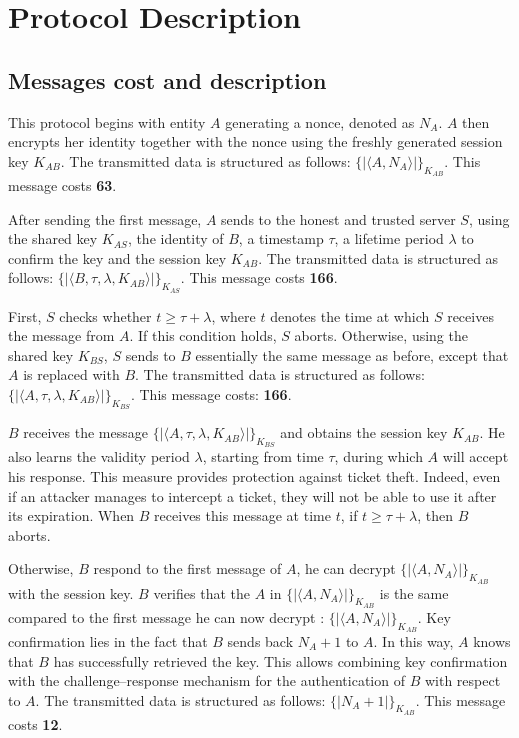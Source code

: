 \section{Protocol Description}

\subsection{Messages cost and description}



This protocol begins with entity $A$ generating a nonce, denoted as $N_A$. $A$ then encrypts her identity together
with the nonce using the freshly generated session key $K_{AB}$. The transmitted data is structured as follows:
$\{| \langle A,N_A \rangle |\}_{K_{AB}}$. This message costs \textbf{63}.

\vspace{1cm}

After sending the first message, $A$ sends to the honest and trusted server $S$, using the shared key $K_{AS}$,
the identity of $B$, a timestamp $\tau$, a lifetime period $\lambda$ to confirm the key and the session key $K_{AB}$.
The transmitted data is structured as follows: $\{| \langle B, \tau, \lambda, K_{AB} \rangle |\}_{K_{AS}}$. This message costs \textbf{166}.

\vspace{1cm}

First, $S$ checks whether $t \geq \tau + \lambda$, where $t$ denotes the time at which $S$ receives the message from
$A$. If this condition holds, $S$ aborts. Otherwise, using the shared key $K_{BS}$, $S$ sends to $B$ essentially the
same message as before, except that $A$ is replaced with $B$. The transmitted data is structured as follows:
$\{| \langle A, \tau, \lambda, K_{AB} \rangle |\}_{K_{BS}}$. This message costs: \textbf{166}.

\vspace{1cm}

$B$ receives the message $\{| \langle A, \tau, \lambda, K_{AB} \rangle |\}_{K_{BS}}$ and obtains the session key $K_{AB}$.
He also learns the validity period $\lambda$, starting from time $\tau$, during which $A$ will accept his response.
This measure provides protection against ticket theft. Indeed, even if an attacker manages to intercept a ticket,
they will not be able to use it after its expiration. When $B$ receives this message at time $t$, if
$t \geq \tau + \lambda$, then $B$ aborts.

Otherwise, $B$ respond to the first message of $A$, he can decrypt $\{| \langle A, N_A \rangle |\}_{K_{AB}}$ with the session key.
$B$ verifies that the $A$ in $\{| \langle A, N_A \rangle |\}_{K_{AB}}$ is the same compared to the first message he can now decrypt : $\{| \langle A,N_A \rangle |\}_{K_{AB}}$.
Key confirmation lies in the fact that $B$ sends back $N_A + 1$ to $A$. In this way, $A$ knows that $B$ has successfully
retrieved the key. This allows combining key confirmation with the challenge–response mechanism for the authentication
of $B$ with respect to $A$. The transmitted data is structured as follows: $\{| N_A + 1|\}_{K_{AB}}$.
This message costs \textbf{12}.

